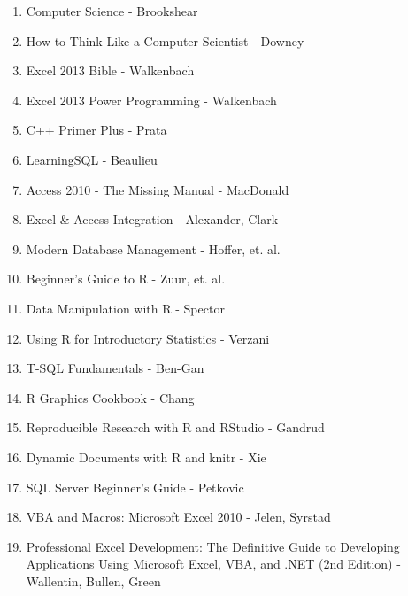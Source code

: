 \documentclass[oneside, titlepage]{article}
\begin{document}
\begin{enumerate}
\item{Computer Science - Brookshear}
\item{How to Think Like a Computer Scientist - Downey}
\item{Excel 2013 Bible - Walkenbach}
\item{Excel 2013 Power Programming - Walkenbach}
\item{C++ Primer Plus - Prata}
\item{LearningSQL - Beaulieu}
\item{Access 2010 - The Missing Manual - MacDonald}
\item{Excel \& Access Integration - Alexander, Clark}
\item{Modern Database Management - Hoffer, et. al.}
\item{Beginner's Guide to R - Zuur, et. al.}
\item{Data Manipulation with R - Spector}
\item{Using R for Introductory Statistics - Verzani}
\item{T-SQL Fundamentals - Ben-Gan}
\item{R Graphics Cookbook - Chang}
\item{Reproducible Research with R and RStudio - Gandrud}
\item{Dynamic Documents with R and knitr - Xie}
\item{SQL Server Beginner's Guide - Petkovic}
\item{VBA and Macros: Microsoft Excel 2010 - Jelen, Syrstad}
\item{Professional Excel Development: The Definitive Guide to Developing Applications Using Microsoft Excel, VBA, and .NET (2nd Edition) - Wallentin, Bullen, Green}
\end{enumerate}
\end{document}
